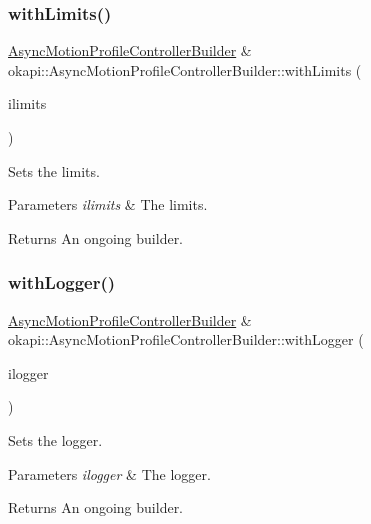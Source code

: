 \subsubsection{\texorpdfstring{withLimits()}{withLimits()}}
{\footnotesize\ttfamily \mbox{\hyperlink{classokapi_1_1AsyncMotionProfileControllerBuilder}{Async\+Motion\+Profile\+Controller\+Builder}} \& okapi\+::\+Async\+Motion\+Profile\+Controller\+Builder\+::with\+Limits (\begin{DoxyParamCaption}\item[{const \mbox{\hyperlink{structokapi_1_1PathfinderLimits}{Pathfinder\+Limits}} \&}]{ilimits }\end{DoxyParamCaption})}

Sets the limits.


\begin{DoxyParams}{Parameters}
{\em ilimits} & The limits. \\
\hline
\end{DoxyParams}
\begin{DoxyReturn}{Returns}
An ongoing builder. 
\end{DoxyReturn}
\mbox{\label{classokapi_1_1AsyncMotionProfileControllerBuilder_aca6d4826cbee5563bf5a664580ef10dc}} 
\subsubsection{\texorpdfstring{withLogger()}{withLogger()}}
{\footnotesize\ttfamily \mbox{\hyperlink{classokapi_1_1AsyncMotionProfileControllerBuilder}{Async\+Motion\+Profile\+Controller\+Builder}} \& okapi\+::\+Async\+Motion\+Profile\+Controller\+Builder\+::with\+Logger (\begin{DoxyParamCaption}\item[{const std\+::shared\+\_\+ptr$<$ \mbox{\hyperlink{classokapi_1_1Logger}{Logger}} $>$ \&}]{ilogger }\end{DoxyParamCaption})}

Sets the logger.


\begin{DoxyParams}{Parameters}
{\em ilogger} & The logger. \\
\hline
\end{DoxyParams}
\begin{DoxyReturn}{Returns}
An ongoing builder. 
\end{DoxyReturn}
\mbox{\label{classokapi_1_1AsyncMotionProfileControllerBuilder_a879afc5d6ea15d8bbebd737cd7e5a1d9}} 

